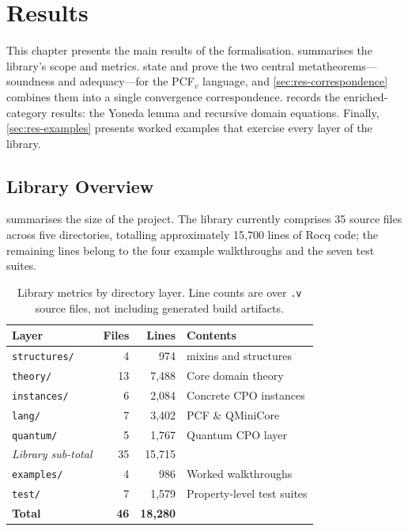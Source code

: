 
\chapter{Results}
\label{ch:results}

This chapter presents the main results of the formalisation.
 summarises the library's scope and
metrics.   state and
prove the two central metatheorems---soundness and adequacy---for the
PCF$_v$ language, and \cref{sec:res-correspondence} combines them into a
single convergence correspondence.
 records the enriched-category results:
the Yoneda lemma and recursive domain equations.
Finally, \cref{sec:res-examples} presents worked examples that
exercise every layer of the library.

\section{Library Overview}
\label{sec:res-overview}

 summarises the size of the project.
The library currently comprises 35 source files across five directories,
totalling approximately 15{,}700 lines of Rocq code; the remaining
lines belong to the four example walkthroughs and the seven
test suites.

\begin{table}[ht]
\centering
\begin{tabular}{l r r l}
\hline
\textbf{Layer} & \textbf{Files} & \textbf{Lines} & \textbf{Contents} \\
\hline
\texttt{structures/} &  4 &    974 & \HB{} mixins and structures \\
\texttt{theory/}     & 13 &  7{,}488 & Core domain theory \\
\texttt{instances/}  &  6 &  2{,}084 & Concrete CPO instances \\
\texttt{lang/}       &  7 &  3{,}402 & PCF \& QMiniCore \\
\texttt{quantum/}    &  5 &  1{,}767 & Quantum CPO layer \\
\hline
\emph{Library sub-total} & 35 & 15{,}715 & \\
\hline
\texttt{examples/}   &  4 &    986 & Worked walkthroughs \\
\texttt{test/}       &  7 &  1{,}579 & Property-level test suites \\
\hline
\textbf{Total}       & \textbf{46} & \textbf{18{,}280} & \\
\hline
\end{tabular}
\caption{Library metrics by directory layer.  Line counts are over
  \texttt{.v} source files, not including generated build
  artifacts.}
\label{tab:library-metrics}
\end{table}

